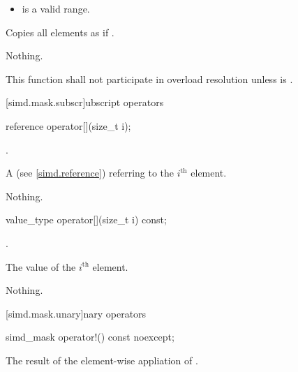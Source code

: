 \begin{itemdescr}
  \pnum\requires
  \begin{itemize}
    \item \tcode{[mem, mem + size())} is a valid range.
  \end{itemize}

  \pnum\effects
  Copies all  elements as if  \foralli.

  \pnum\throws Nothing.

  \pnum\remarks
  This function shall not participate in overload resolution unless  is .
\end{itemdescr}

[simd.mask.subscr]{\texorpdfstring{ubscript}{simd_mask subscript} operators}

\begin{itemdecl}
reference operator[](size_t i);
\end{itemdecl}

\begin{itemdescr}
  \pnum\requires
  .

  \pnum\returns
  A  (see \ref{simd.reference}) referring to the $i^\text{th}$ element.

  \pnum\throws Nothing.
\end{itemdescr}

\begin{itemdecl}
value_type operator[](size_t i) const;
\end{itemdecl}

\begin{itemdescr}
  \pnum\requires
  .

  \pnum\returns
  The value of the $i^\text{th}$ element.

  \pnum\throws Nothing.
\end{itemdescr}

[simd.mask.unary]{\texorpdfstring{nary}{simd_mask unary} operators}

\begin{itemdecl}
simd_mask operator!() const noexcept;
\end{itemdecl}

\begin{itemdescr}
  \pnum\returns
  The result of the element-wise appliation of .
\end{itemdescr}

